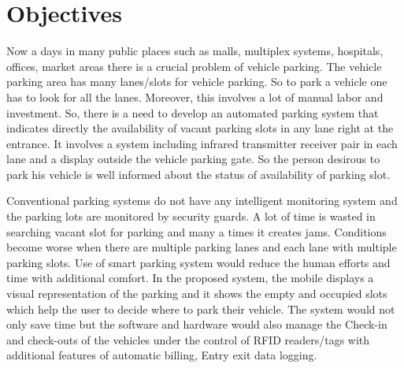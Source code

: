 \documentclass[12pt,a4paper]{report}
\begin{document}
\section{Objectives}
Now a days  in  many  public  places  such  as  malls,  multiplex 
systems,  hospitals,  offices,  market  areas  there  is  a  crucial 
problem   of   vehicle   parking.   The   vehicle parking   area   has   many 
lanes/slots for vehicle parking. So to park a vehicle one has to look for 
all the lanes. 
Moreover,
this involves a lot of 
manual labor and 
investment. 
So,
there  is  a  need  to  develop  an  automated 
parking   system   that   indicates   directly   the   availability   of 
vacant  parking  slots  in  any  lane  right  at  the  entrance.  It 
involves a system including infrared transmitter receiver pair 
in each lane and a display outside the vehicle parking gate. So the 
person desirous to park his vehicle is well informed about the 
status of availability of parking slot. 
\par Conventional  parking  systems  do  not  have  any  intelligent 
monitoring  system  and  the  parking  lots  are  monitored  by 
security  guards.  A  lot  of  time  is  wasted  in  searching  vacant 
slot  for parking and  many a times it creates jams. Conditions 
become worse when there are multiple parking lanes and each 
lane  with  multiple parking  slots. Use of smart parking  
system   would   reduce   the   human   efforts   and   time   with 
additional  comfort.  In  the  proposed  system,  the  mobile  
displays  a  visual  representation  of  the  parking  and  it  shows 
the  empty  and  occupied  slots  which  help  the  user  to  decide 
where to park their vehicle. The system would not only save time 
but the software and hardware would also manage the Check-in  and  check-outs  of  the  vehicles  under  the  control  of  RFID 
readers/tags  with  additional  features  of  automatic  billing, 
Entry exit data logging.
\end{document}
